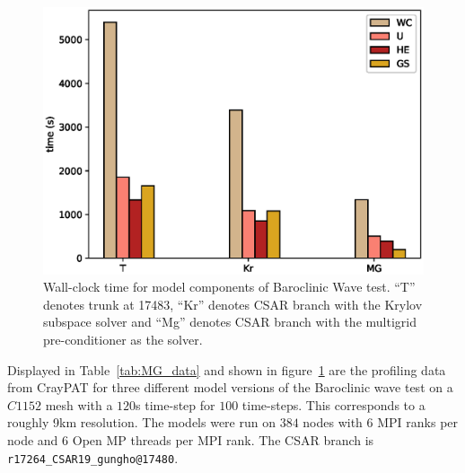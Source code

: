 \begin{figure}[ht!]
\centering\includegraphics[width=1.0\linewidth]{figs/mg-improvement.eps}
\caption{\label{fig:mg}Wall-clock time for model components of
  Baroclinic Wave test. ``T'' denotes trunk at 17483, ``Kr'' denotes
  CSAR branch with the Krylov subspace solver and ``Mg'' denotes
  CSAR branch with the multigrid pre-conditioner as the solver.}
\end{figure} 

Displayed in Table~\ref{tab:MG_data} and shown in figure~\ref{fig:mg}
are the profiling data from CrayPAT for three different model versions
of the Baroclinic wave test on a $C1152$ mesh with a $120$s time-step
for $100$ time-steps. This corresponds to a roughly 9km
resolution. The models were run on $384$ nodes with $6$ MPI ranks per
node and $6$ Open MP threads per MPI rank.  The CSAR branch is \verb+r17264_CSAR19_gungho@17480+.